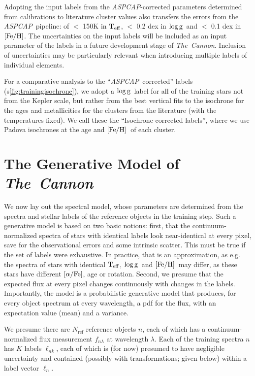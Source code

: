 \documentclass[12pt, preprint]{aastex}
\newcommand{\figurenames}{\figurename s}
\newcommand{\tc}{\textsl{The~Cannon}}
\newcommand{\aspcap}{\textsl{ASPCAP}}
\newcommand{\set}[1]{\bm{#1}}
\newcommand{\starlabel}{\ell}
\newcommand{\starlabelvec}{\set{\starlabel}}
\newcommand{\teff}{\mbox{$\rm T_{eff}$}}
\newcommand{\feh}{\mbox{$\rm [Fe/H]$}}
\newcommand{\alphafe}{\mbox{$\rm [\alpha/Fe]$}}
\newcommand{\logg}{\mbox{$\rm \log g$}}
\newcommand{\rfn}{\mathrm{ref}}
\begin{document}
Adopting the input labels from the \aspcap-corrected parameters determined from calibrations to literature cluster values also transfers the errors from the \aspcap\ pipeline: of $<$ 150K in \teff,  $<$ 0.2 dex in \logg\ and $<$ 0.1 dex in \feh.   
The uncertainties on the input labels will be included as an input parameter of the labels in a future development stage of \tc. Inclusion of uncertainties may be particularly relevant when introducing multiple labels of individual elements. 

For a comparative analysis to the ``\aspcap\ corrected'' labels (\figurenames\ref{fig:trainingisochrone}), we adopt a \logg\ label for all of the training stars not from the Kepler scale, but rather from the best vertical fits to the isochrone for the ages and metallicities for the clusters from the literature (with the temperatures fixed).
We call these the ``Isochrone-corrected labels'', where we use Padova isochrones at the age and \feh\ of each cluster. 

\section{The Generative Model of \tc}
\label{sec:spectralmodel}

We now lay out the spectral model, whose parameters are determined 
from the spectra and stellar labels of the reference objects in the training step.
Such a generative model is based on two basic notions: first, that the continuum-normalized spectra of
stars with identical labels look near-identical at every pixel, save for the observational errors
and some intrinsic scatter. This must be true if the set of labels were exhaustive. 
In practice, that is an approximation, as e.g. the spectra of stars with identical \teff , \logg \ and \feh\ may differ, 
as these stars have different \alphafe , age or rotation. Second, we presume that the expected flux at every pixel changes continuously
with changes in the labels.
Importantly, the model is a probabilistic generative model that produces,
for every object spectrum at every wavelength,
a pdf for the flux, with an expectation value (mean) and a variance.

We presume there are $N_\rfn$ reference objects $n$, each of which has
a continuum-normalized flux measurement $f_{n\lambda}$ at wavelength
$\lambda$. Each of the training spectra $n$ has $K$ labels $\starlabel_{nk}$, each of which
is (for now) presumed to have negligible uncertainty and contained (possibly with transformations; given below)
within a label vector $\starlabelvec_n$.
\end{document}
